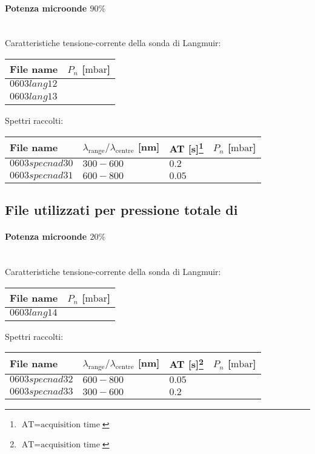 \paragraph*{Potenza microonde $\text{90\%}$} ~\\
Caratteristiche tensione-corrente della sonda di Langmuir:
\begin{center}
\begin{tabular}{p{3cm}p{3cm}}
\toprule
File name	&$P_n$ [$\si{\milli\bar}$]\\
\midrule
$0603lang12$	&$  $\\
$0603lang13$	&$  $\\
\bottomrule
\end{tabular}
\end{center}

Spettri raccolti:
\begin{center}
\begin{tabular}{p{3cm}p{4cm}p{2cm}p{3cm}}
\toprule
File name	&$\lambda_\text{range}\text{/}\lambda_\text{centre}$ [nm] 	&AT [s]\footnote{$\text{AT}=\text{acquisition time}$} &$P_n$ [$\si{\milli\bar}$]\\
\midrule
$0603specnad30$	&$300-600$	&$0.2$		&$  $\\
$0603specnad31$	&$600-800$	&$0.05$		&$  $\\


\bottomrule
\end{tabular}
\end{center}

\subsection{File utilizzati per pressione totale di $  $}

\paragraph*{Potenza microonde $\text{20\%}$}~\\
Caratteristiche tensione-corrente della sonda di Langmuir:
\begin{center}
\begin{tabular}{p{3cm}p{3cm}}
\toprule
File name	&$P_{n}$ [$\si{\milli\bar}$]\\
\midrule
$0603lang14$	&$  $\\

\bottomrule
\end{tabular}
\end{center}

Spettri raccolti:
\begin{center}
\begin{tabular}{p{3cm}p{4cm}p{2cm}p{3cm}}
\toprule
File name	&$\lambda_\text{range}\text{/}\lambda_\text{centre}$ [nm] &AT [s]\footnote{$\text{AT}=\text{acquisition time}$} &$P_{n}$ [$\si{\milli\bar}$]\\
\midrule
$0603specnad32$	&$600-800$	&$0.05$		&$  $\\
$0603specnad33$	&$300-600$	&$0.2$		&$  $\\


\bottomrule
\end{tabular}
\end{center}

